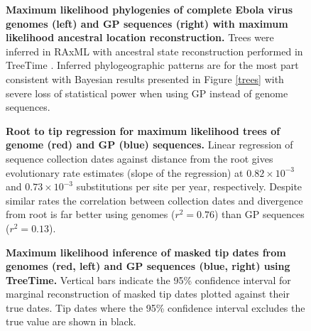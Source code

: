 \documentclass{bmcart}
\def\texttt{[image: ]}
\begin{document}
\begin{figure}[h]
 \centering
	\caption{\textbf{Maximum likelihood phylogenies of complete Ebola virus genomes (left) and GP sequences (right) with maximum likelihood ancestral location reconstruction.}
  Trees were inferred in RAxML \cite{stamatakis_raxml_2014} with ancestral state reconstruction performed in TreeTime \cite{sagulenko_treetime:_2018}.
  Inferred phylogeographic patterns are for the most part consistent with Bayesian results presented in Figure \ref{trees} with severe loss of statistical power when using GP instead of genome sequences.
	}
	\label{TTtrees}
\end{figure}

\begin{figure}[h]
 \centering
	\caption{\textbf{Root to tip regression for maximum likelihood trees of genome (red) and GP (blue) sequences.}
  Linear regression of sequence collection dates against distance from the root gives evolutionary rate estimates (slope of the regression) at $0.82\times10^{-3}$ and $0.73\times10^{-3}$ substitutions per site per year, respectively.
  Despite similar rates the correlation between collection dates and divergence from root is far better using genomes ($r^{2}=0.76$) than GP sequences ($r^{2}=0.13$).
	}
	\label{rtt}
\end{figure}

\begin{figure}[h]
 \centering
	\caption{\textbf{Maximum likelihood inference of masked tip dates from genomes (red, left) and GP sequences (blue, right) using TreeTime.}
  Vertical bars indicate the 95\% confidence interval for marginal reconstruction of masked tip dates plotted against their true dates.
  Tip dates where the 95\% confidence interval excludes the true value are shown in black.
	}
	\label{TTdates}
\end{figure}
\end{document}
